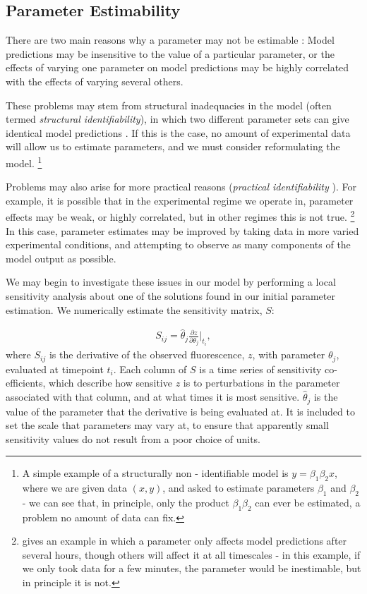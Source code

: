 \documentclass[10pt,journal]{./IEEE_latex_class/IEEEtran}
\begin{document}
 \subsection{Parameter Estimability}
\label{Parameter Estimability}
 
 There are two main reasons why a parameter may not be estimable \cite{Mclean2012,Yao2003, Beck}: Model predictions may be insensitive to the value of a particular parameter, or the effects of varying one parameter on model predictions may be highly correlated with the effects of varying several others.
 
These problems may stem from structural inadequacies in the model (often termed \textit{structural identifiability}), in which two different parameter sets can give identical model predictions \cite{Jimenez-Hornero2008,Grewal1976 }. If this is the case, no amount of experimental data will allow us to estimate parameters, and we must consider reformulating the model. \footnote{A simple example of a structurally non - identifiable model is $y = \beta_{1}\beta_{2}x$, where we are given data $(x,y)$, and asked to estimate parameters $\beta_{1}$ and $\beta_{2}$ - we can see that, in principle, only the product $\beta_{1}\beta_{2}$ can ever be estimated, a problem no amount of data can fix.}

Problems may also arise for more practical reasons (\textit{practical identifiability} \cite{Mclean2012}). For example, it is possible that in the experimental regime we operate in, parameter effects may be weak, or highly correlated, but in other regimes this is not true. \footnote{\cite{Beck} gives an example in which a parameter only affects model predictions after several hours, though others will affect it at all timescales - in this example, if we only took data for a few minutes, the parameter would be inestimable, but in principle it is not.} In this case, parameter estimates may be improved by taking data in more varied experimental conditions, and attempting to observe as many components of the model output as possible. 
 
 We may begin to investigate these issues in our model by performing a local sensitivity analysis about one of the solutions found in our initial parameter estimation. We numerically estimate the sensitivity matrix, $S$:
 
 \begin{align}
S_{ij} = \hat{\theta}_{j} \frac{\partial z}{ \partial \theta_{j}}\Bigr|_{t_{i}},
\end{align}
where $S_{ij}$ is the derivative of the observed fluorescence, $z$, with parameter $\theta_{j}$, evaluated at timepoint $t_{i}$. Each column of $S$ is a time series of sensitivity co-efficients, which describe how sensitive $z$ is to perturbations in the parameter associated with that column, and at what times it is most sensitive. $\hat{\theta}_{j}$ is the value of the parameter that the derivative is being evaluated at. It is included to set the scale that parameters may vary at, to ensure that apparently small sensitivity values do not result from a poor choice of units.
\end{document}
